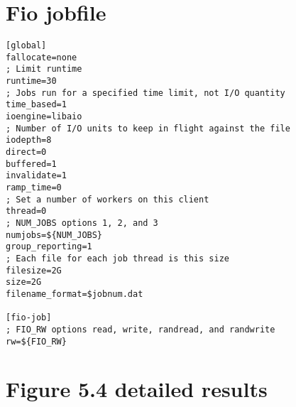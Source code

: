 \chapter{Fio jobfile}
\label{appendix:fio_jobfile}

\begin{lstlisting}
[global]
fallocate=none
; Limit runtime
runtime=30
; Jobs run for a specified time limit, not I/O quantity
time_based=1
ioengine=libaio
; Number of I/O units to keep in flight against the file
iodepth=8
direct=0
buffered=1
invalidate=1
ramp_time=0
; Set a number of workers on this client
thread=0
; NUM_JOBS options 1, 2, and 3
numjobs=${NUM_JOBS}
group_reporting=1
; Each file for each job thread is this size
filesize=2G
size=2G
filename_format=$jobnum.dat

[fio-job]
; FIO_RW options read, write, randread, and randwrite
rw=${FIO_RW}
\end{lstlisting}

\chapter{Figure 5.4 detailed results}

